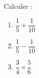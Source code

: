 
\begin{exercice}\label{exo2smath-0002}

    Calculer :
    \begin{enumerate}
        \item
            \( \dfrac{ 1 }{ 5 }+\dfrac{ 1 }{ 10 }\)
        \item
            \( \dfrac{ 1 }{ 5 }-\dfrac{ 1 }{ 10 }\)
        \item
            \( \dfrac{ 3 }{ 4 }\times \dfrac{ 5 }{ 6 }\)
    \end{enumerate}

\end{exercice}
